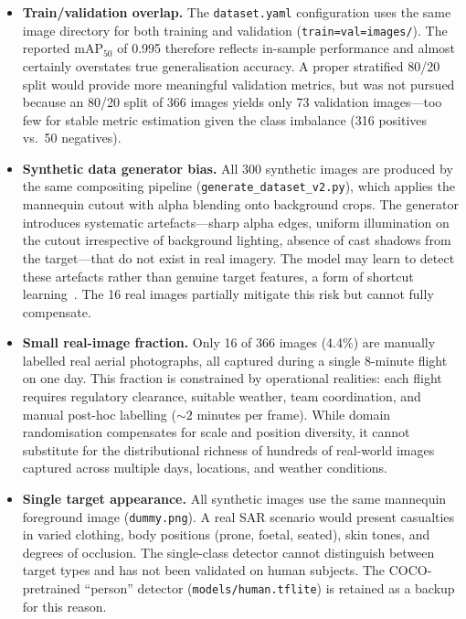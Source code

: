 \begin{itemize}
    \item \textbf{Train/validation overlap.} The \texttt{dataset.yaml} configuration uses the same image directory for both training and validation (\texttt{train=val=images/}). The reported mAP$_{50}$ of 0.995 therefore reflects in-sample performance and almost certainly overstates true generalisation accuracy. A proper stratified 80/20 split would provide more meaningful validation metrics, but was not pursued because an 80/20 split of 366 images yields only 73 validation images---too few for stable metric estimation given the class imbalance (316 positives vs.\ 50 negatives).

    \item \textbf{Synthetic data generator bias.} All 300 synthetic images are produced by the same compositing pipeline (\texttt{generate\_dataset\_v2.py}), which applies the mannequin cutout with alpha blending onto background crops. The generator introduces systematic artefacts---sharp alpha edges, uniform illumination on the cutout irrespective of background lighting, absence of cast shadows from the target---that do not exist in real imagery. The model may learn to detect these artefacts rather than genuine target features, a form of shortcut learning~\cite{domainrand}. The 16 real images partially mitigate this risk but cannot fully compensate.

    \item \textbf{Small real-image fraction.} Only 16 of 366 images (4.4\%) are manually labelled real aerial photographs, all captured during a single 8-minute flight on one day. This fraction is constrained by operational realities: each flight requires regulatory clearance, suitable weather, team coordination, and manual post-hoc labelling (${\sim}2$ minutes per frame). While domain randomisation compensates for scale and position diversity, it cannot substitute for the distributional richness of hundreds of real-world images captured across multiple days, locations, and weather conditions.

    \item \textbf{Single target appearance.} All synthetic images use the same mannequin foreground image (\texttt{dummy.png}). A real SAR scenario would present casualties in varied clothing, body positions (prone, foetal, seated), skin tones, and degrees of occlusion. The single-class detector cannot distinguish between target types and has not been validated on human subjects. The COCO-pretrained ``person'' detector (\texttt{models/human.tflite}) is retained as a backup for this reason.


\end{itemize}
